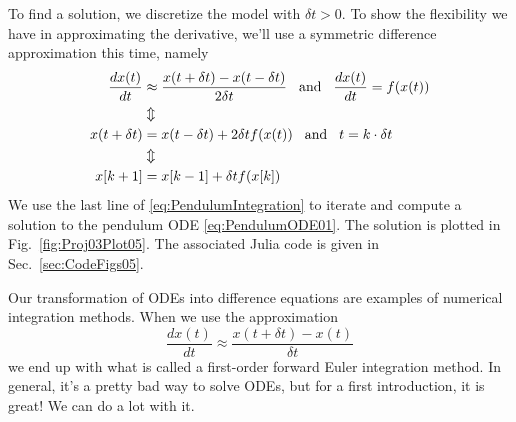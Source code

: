 To find a solution, we discretize the model with $\delta t>0$. To show the flexibility we have in approximating the derivative, we'll use a symmetric difference approximation this time, namely
\begin{equation}
\label{eq:PendulumIntegration}
\begin{aligned}
    \frac{dx(t)}{dt} &\approx \frac{x(t+\delta t) - x(t- \delta t)}{ 2\delta t} \hspace*{.3cm}\text{and} \hspace*{.3cm}\frac{dx(t)}{dt} = f(x(t))\\
    &\Updownarrow \\
   x(t+\delta t) &= x(t-\delta t) + 2 \delta t f(x(t)) \hspace*{.3cm}\text{and} \hspace*{.3cm} t=k\cdot \delta t\\
   &\Updownarrow \\
   x[k+1] & = x[k-1] + \delta t f(x[k])
\end{aligned}
\end{equation}
We use the last line of \eqref{eq:PendulumIntegration} to iterate and compute a solution to the pendulum ODE \eqref{eq:PendulumODE01}. The solution is plotted in Fig.~\ref{fig:Proj03Plot05}. The associated Julia code is given in Sec.~\ref{sec:CodeFigs05}.  

\begin{tcolorbox}
Our transformation of ODEs into difference equations are examples of numerical integration methods. When we use the approximation 
$$\frac{dx(t)}{dt} \approx \frac{x(t + \delta t)-x(t)}{\delta t }  $$
we end up with what is called a first-order forward Euler integration method. In general, it's a pretty bad way to solve ODEs, but for a first introduction, it is great! We can do a lot with it.
\end{tcolorbox}


